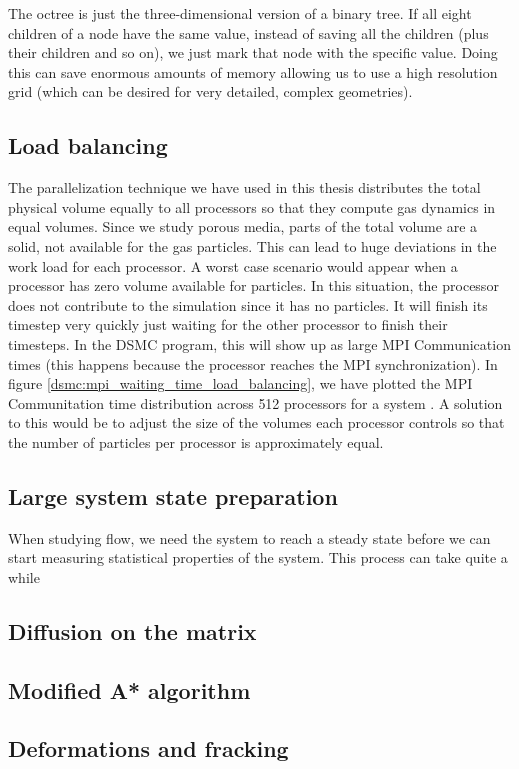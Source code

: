 The octree is just the three-dimensional version of a binary tree. If all eight children of a node have the same value, instead of saving all the children (plus their children and so on), we just mark that node with the specific value. Doing this can save enormous amounts of memory allowing us to use a high resolution grid (which can be desired for very detailed, complex geometries).

\subsection{Load balancing}
\label{sec:future_work_load_balancing}
The parallelization technique we have used in this thesis distributes the total physical volume equally to all processors so that they compute gas dynamics in equal volumes. Since we study porous media, parts of the total volume are a solid, not available for the gas particles. This can lead to huge deviations in the work load for each processor. A worst case scenario would appear when a processor has zero volume available for particles. In this situation, the processor does not contribute to the simulation since it has no particles. It will finish its timestep very quickly just waiting for the other processor to finish their timesteps. In the DSMC program, this will show up as large MPI Communication times (this happens because the processor reaches the MPI synchronization). In figure \ref{dsmc:mpi_waiting_time_load_balancing}, we have plotted the MPI Communitation time distribution across 512 processors for a system . A solution to this would be to adjust the size of the volumes each processor controls so that the number of particles per processor is approximately equal. 
\subsection{Large system state preparation}
When studying flow, we need the system to reach a steady state before we can start measuring statistical properties of the system. This process can take quite a while 
\subsection{Diffusion on the matrix}
\subsection{Modified A* algorithm}
\subsection{Deformations and fracking}
